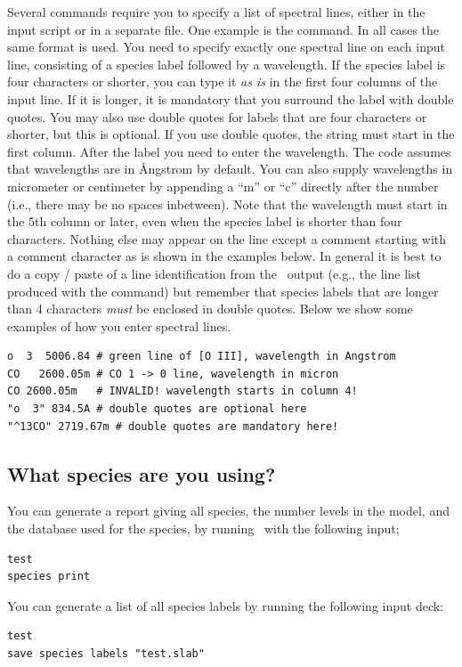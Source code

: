 Several commands require you to specify a list of spectral lines, either in
the input script or in a separate file. One example is the  command. In all cases the same format is used. You need to
specify exactly one spectral line on each input line, consisting of a species
label followed by a wavelength. If the species label is four characters or
shorter, you can type it {\it as is} in the first four columns of the input
line. If it is longer, it is mandatory that you surround the label with double
quotes. You may also use double quotes for labels that are four characters or
shorter, but this is optional. If you use double quotes, the string must start
in the first column. After the label you need to enter the wavelength. The
code assumes that wavelengths are in \AA ngstrom by default. You can also
supply wavelengths in micrometer or centimeter by appending a ``m'' or ``c''
directly after the number (i.e., there may be no spaces inbetween). Note that
the wavelength must start in the 5th column or later, even when the species
label is shorter than four characters. Nothing else may appear on the line
except a comment starting with a comment character as is shown in the examples
below. In general it is best to do a copy / paste of a line identification
from the \Cloudy\ output (e.g., the line list produced with the
 command) but remember that species labels that
are longer than 4 characters {\em must} be enclosed in double quotes. Below we
show some examples of how you enter spectral lines.
\begin{verbatim}
o  3  5006.84 # green line of [O III], wavelength in Angstrom
CO   2600.05m # CO 1 -> 0 line, wavelength in micron
CO 2600.05m   # INVALID! wavelength starts in column 4!
"o  3" 834.5A # double quotes are optional here
"^13CO" 2719.67m # double quotes are mandatory here!
\end{verbatim}

\subsection{What species are you using?}

You can generate a report giving all species, the number levels in the model,
and the database used for the species,
by running \Cloudy\ with the following input;
\begin{verbatim}
test
species print
\end{verbatim}

You can generate a list of all species labels by running the following input deck:
\begin{verbatim}
test
save species labels "test.slab"
\end{verbatim}

